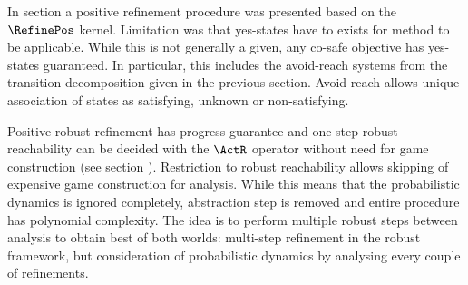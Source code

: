 
\startsubsection[title={Robust Reachability Refinement},reference=sec:refinement-transition-reachability]

    In section  a positive refinement procedure was presented based on the $\RefinePos$ kernel.
    Limitation was that yes-states have to exists for method to be applicable.
    While this is not generally a given, any co-safe objective has yes-states guaranteed.
    In particular, this includes the avoid-reach systems from the transition decomposition given in the previous section.
    Avoid-reach allows unique association of states as satisfying, unknown or non-satisfying.

    Positive robust refinement has progress guarantee and one-step robust reachability can be decided with the $\ActR$ operator without need for game construction (see section ).
    Restriction to robust reachability allows skipping of expensive game construction for analysis.
    While this means that the probabilistic dynamics is ignored completely, abstraction step is removed and entire procedure has polynomial complexity.
    The idea is to perform multiple robust steps between analysis to obtain best of both worlds: multi-step refinement in the robust framework, but consideration of probabilistic dynamics by analysing every couple of refinements.

